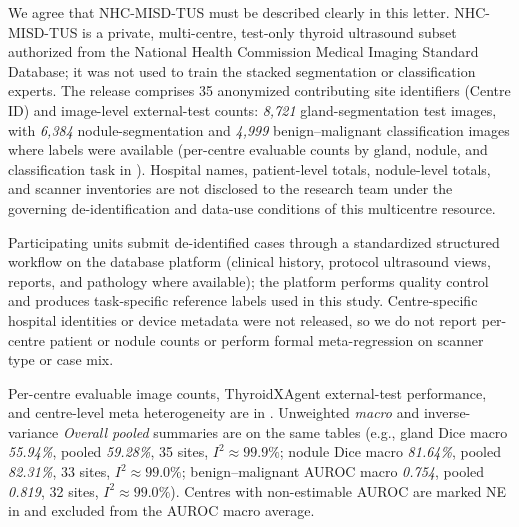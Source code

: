 \begin{authorresponse}
We agree that NHC-MISD-TUS must be described clearly in this letter. NHC-MISD-TUS is a private, multi-centre, test-only thyroid ultrasound subset authorized from the National Health Commission Medical Imaging Standard Database; it was not used to train the stacked segmentation or classification experts. The release comprises 35 anonymized contributing site identifiers (Centre ID) and image-level external-test counts: \emph{8{,}721} gland-segmentation test images, with \emph{6{,}384} nodule-segmentation and \emph{4{,}999} benign--malignant classification images where labels were available (per-centre evaluable counts by gland, nodule, and classification task in ). Hospital names, patient-level totals, nodule-level totals, and scanner inventories are not disclosed to the research team under the governing de-identification and data-use conditions of this multicentre resource.\par
Participating units submit de-identified cases through a standardized structured workflow on the database platform (clinical history, protocol ultrasound views, reports, and pathology where available); the platform performs quality control and produces task-specific reference labels used in this study. Centre-specific hospital identities or device metadata were not released, so we do not report per-centre patient or nodule counts or perform formal meta-regression on scanner type or case mix.\par
Per-centre evaluable image counts, ThyroidXAgent external-test performance, and centre-level meta heterogeneity are in . Unweighted \emph{macro} and inverse-variance \emph{Overall pooled} summaries are on the same tables (e.g., gland Dice macro \emph{55.94\%}, pooled \emph{59.28\%}, 35 sites, $I^2{\approx}99.9\%$; nodule Dice macro \emph{81.64\%}, pooled \emph{82.31\%}, 33 sites, $I^2{\approx}99.0\%$; benign--malignant AUROC macro \emph{0.754}, pooled \emph{0.819}, 32 sites, $I^2{\approx}99.0\%$). Centres with non-estimable AUROC are marked NE in  and excluded from the AUROC macro average.\par
\par
\end{authorresponse}

